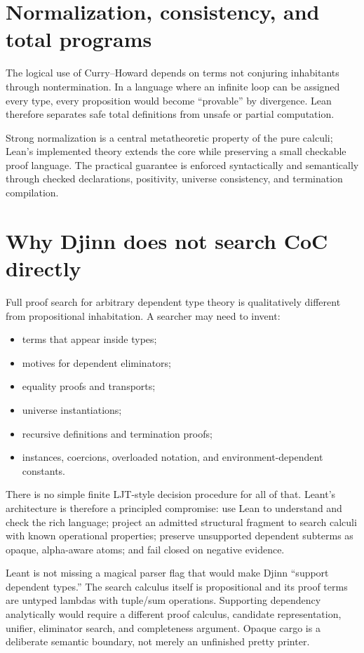 \documentclass[10pt,letterpaper,oneside,openany]{report}
\begin{document}
\section{Normalization, consistency, and total programs}

The logical use of Curry--Howard depends on terms not conjuring inhabitants through nontermination.  In a language where an infinite loop can be assigned every type, every proposition would become ``provable'' by divergence.  Lean therefore separates safe total definitions from unsafe or partial computation.

Strong normalization is a central metatheoretic property of the pure calculi; Lean's implemented theory extends the core while preserving a small checkable proof language.  The practical guarantee is enforced syntactically and semantically through checked declarations, positivity, universe consistency, and termination compilation.

\section{Why Djinn does not search CoC directly}

Full proof search for arbitrary dependent type theory is qualitatively different from propositional inhabitation.  A searcher may need to invent:

\begin{itemize}
\item terms that appear inside types;
\item motives for dependent eliminators;
\item equality proofs and transports;
\item universe instantiations;
\item recursive definitions and termination proofs;
\item instances, coercions, overloaded notation, and environment-dependent constants.
\end{itemize}

There is no simple finite LJT-style decision procedure for all of that.  Leant's architecture is therefore a principled compromise: use Lean to understand and check the rich language; project an admitted structural fragment to search calculi with known operational properties; preserve unsupported dependent subterms as opaque, alpha-aware atoms; and fail closed on negative evidence.

\begin{leantbox}
Leant is not missing a magical parser flag that would make Djinn ``support dependent types.''  The search calculus itself is propositional and its proof terms are untyped lambdas with tuple/sum operations.  Supporting dependency analytically would require a different proof calculus, candidate representation, unifier, eliminator search, and completeness argument.  Opaque cargo is a deliberate semantic boundary, not merely an unfinished pretty printer.
\end{leantbox}
\end{document}
